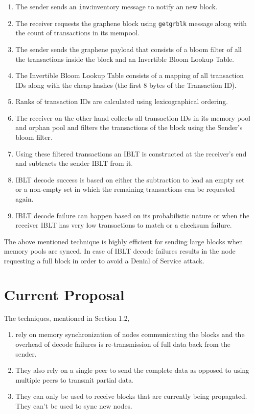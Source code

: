 \begin{enumerate}
    \item The sender sends an \texttt{inv}:inventory message to notify an new
        block.
    \item The receiver requests the graphene block using \texttt{getgrblk}
        message along with the count of transactions in its mempool.
    \item The sender sends the graphene payload that consists of a bloom filter
        of all the transactions inside the block and an Invertible Bloom Lookup Table.
    \item The Invertible Bloom Lookup Table consists of a mapping of all
        transaction IDs along with the cheap hashes (the first 8 bytes of the
        Transaction ID).
    \item Ranks of transaction IDs are calculated using lexicographical ordering.
    \item The receiver on the other hand collects all transaction IDs in its
        memory pool and orphan pool and filters the transactions of the block
        using the Sender's bloom filter.
    \item Using these filtered transactions an IBLT is constructed at the
        receiver's end and subtracts the sender IBLT from it. 
    \item IBLT decode success is based on either the subtraction to lead an
        empty set or a non-empty set in which the remaining transactions can be
        requested again.
    \item IBLT decode failure can happen based on its probabilistic nature or
        when the receiver IBLT has very low transactions to match or a checksum
        failure.
\end{enumerate}

The above mentioned technique is highly efficient for sending large blocks when
memory pools are synced. In case of IBLT decode failures results in the node requesting a full block in order to avoid a Denial of Service attack.

\section{Current Proposal}

The techniques, mentioned in Section 1.2, 

\begin{enumerate} 
    \item rely on memory synchronization of nodes communicating the blocks and the overhead of decode failures is 
        re-transmission of full data back from the sender. 
    \item They also rely on a single
        peer to send the complete data as opposed to using multiple peers to transmit partial
        data. 
    \item They can only be used to receive blocks that are currently being propagated. They can't be used to sync new nodes. 

\end{enumerate}


